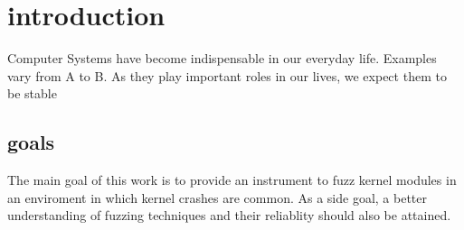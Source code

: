 \section{introduction}


Computer Systems have become indispensable in our everyday life. Examples vary 
from A to B. As they play important roles in our lives, we expect them to be 
stable


\subsection{goals}


The main goal of this work is to provide an instrument to fuzz kernel modules
in an enviroment in which kernel crashes are common. As a side goal, a better 
understanding of fuzzing techniques and their reliablity should also be attained.